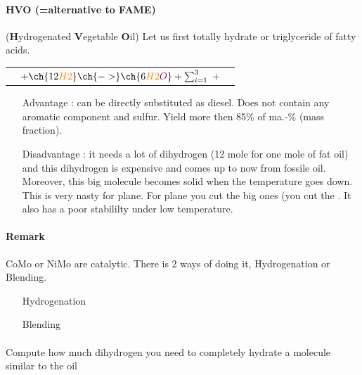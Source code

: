 \documentclass[10pt,a4paper]{article}
\begin{document}
\paragraph{HVO (=alternative to FAME)}(\textbf{H}ydrogenated \textbf{V}egetable \textbf{O}il) Let us first totally hydrate or triglyceride of fatty acids.


\begin{tabularx}{\textwidth}{  X  r  X }
  \noindent\parbox[c]{\hsize}{ } & $+ \ch{12 {\color{orange}H2}} \ch{->} \ch{6 {\color{orange}H2}{\color{violet}O}} + \sum_{i=1}^3$  $+$& \noindent\parbox[c]{\hsize}{}  \\
\end{tabularx}

\begin{itemize}
\item[Advantage] : can be directly substituted as diesel. Does not contain any aromatic component and sulfur. Yield more then 85\% of ma.-\% (mass fraction).
\item[Disadvantage] : it needs a lot of dihydrogen (12 mole for one mole of fat oil) and this dihydrogen is expensive and comes up to now from fossile oil. Moreover, this big molecule becomes solid when the temperature goes down. This is very nasty for plane. For plane you cut the big ones (you cut the . It also has a poor stabililty under low temperature. 
\end{itemize}

\paragraph{Remark} CoMo or NiMo are catalytic. There is 2 ways of doing it, Hydrogenation or Blending.

\begin{itemize}
\item[Hydrogenation]
\item[Blending]
\end{itemize}
\paragraph{\color{red}{Exam Question}}Compute how much dihydrogen you need to completely hydrate a molecule similar to the oil
\end{document}
